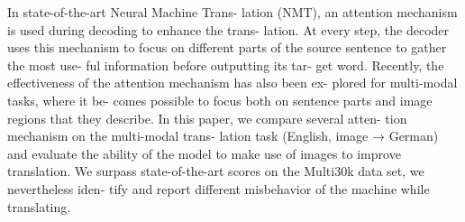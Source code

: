 In state-of-the-art Neural Machine Trans- lation (NMT), an attention mechanism is used during decoding to enhance the trans- lation. At every step, the decoder uses this mechanism to focus on different parts of the source sentence to gather the most use- ful information before outputting its tar- get word. Recently, the effectiveness of the attention mechanism has also been ex- plored for multi-modal tasks, where it be- comes possible to focus both on sentence parts and image regions that they describe. In this paper, we compare several atten- tion mechanism on the multi-modal trans- lation task (English, image → German) and evaluate the ability of the model to make use of images to improve translation. We surpass state-of-the-art scores on the Multi30k data set, we nevertheless iden- tify and report different misbehavior of the machine while translating.

